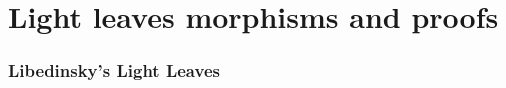 % 
% 
% 
% 
% 
% 

\part{Light leaves morphisms and proofs}

\label{pt:proofs}


\section{Libedinsky's Light Leaves} \label{sec-LLL}

